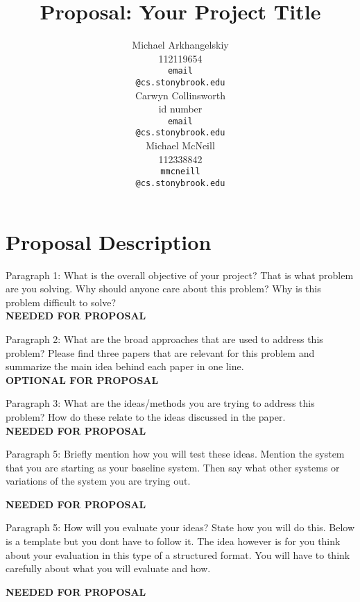 \documentclass[11pt,a4paper]{article}
\title{Proposal: Your Project Title}
\author{Michael Arkhangelskiy \\
  112119654 \\
  {\tt email} \\
  {\tt @cs.stonybrook.edu} \\\And
  Carwyn Collinsworth \\
  id number \\
  {\tt email} \\
  {\tt @cs.stonybrook.edu} \\\And
  Michael McNeill \\
  112338842 \\
  {\tt mmcneill} \\
  {\tt @cs.stonybrook.edu} \\}
\date{}
\begin{document}
\maketitle




\section{Proposal Description}

Paragraph 1: What is the overall objective of your project? That is what problem are you solving. Why should anyone care about this problem?
Why is this problem difficult to solve?\\

\textbf{NEEDED FOR PROPOSAL}

Paragraph 2: What are the broad approaches that are used to address this problem? Please find three papers that are relevant for this problem and summarize the main idea behind each paper in one line.\\

\textbf{OPTIONAL FOR PROPOSAL}

Paragraph 3: What are the ideas/methods you are trying to address this problem? How do these relate to the ideas discussed in the paper.  \\

\textbf{NEEDED FOR PROPOSAL}

Paragraph 5: Briefly mention how you will test these ideas. Mention the system that you are starting as your baseline system. 
Then say what other systems or variations of the system you are trying out.

\textbf{NEEDED FOR PROPOSAL}

Paragraph 5: How will you evaluate your ideas? State how you will do this. Below is a template but you dont have to follow it. The idea however is for you think about your evaluation in this type of a structured format. You will have to think carefully about what you will evaluate and how.

\textbf{NEEDED FOR PROPOSAL}
\end{document}
